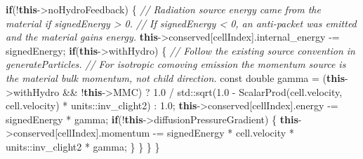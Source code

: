 \documentclass[
]{article}
\newenvironment{Shaded}{}{}
\newcommand{\AttributeTok}[1]{\textcolor[rgb]{0.49,0.56,0.16}{#1}}
\newcommand{\BuiltInTok}[1]{\textcolor[rgb]{0.00,0.50,0.00}{#1}}
\newcommand{\CommentTok}[1]{\textcolor[rgb]{0.38,0.63,0.69}{\textit{#1}}}
\newcommand{\ControlFlowTok}[1]{\textcolor[rgb]{0.00,0.44,0.13}{\textbf{#1}}}
\newcommand{\DataTypeTok}[1]{\textcolor[rgb]{0.56,0.13,0.00}{#1}}
\newcommand{\FloatTok}[1]{\textcolor[rgb]{0.25,0.63,0.44}{#1}}
\newcommand{\KeywordTok}[1]{\textcolor[rgb]{0.00,0.44,0.13}{\textbf{#1}}}
\newcommand{\NormalTok}[1]{#1}
\newcommand{\OperatorTok}[1]{\textcolor[rgb]{0.40,0.40,0.40}{#1}}
\begin{document}
\begin{Shaded}
\begin{Highlighting}[]
    \ControlFlowTok{if}\OperatorTok{(!}\KeywordTok{this}\OperatorTok{{-}\textgreater{}}\NormalTok{noHydroFeedback}\OperatorTok{)}
    \OperatorTok{\{}
        \CommentTok{// Radiation source energy came from the material if signedEnergy \textgreater{} 0.}
        \CommentTok{// If signedEnergy \textless{} 0, an anti{-}packet was emitted and the material gains energy.}
        \KeywordTok{this}\OperatorTok{{-}\textgreater{}}\NormalTok{conserved}\OperatorTok{[}\NormalTok{cellIndex}\OperatorTok{].}\NormalTok{internal\_energy }\OperatorTok{{-}=}\NormalTok{ signedEnergy}\OperatorTok{;}
        \ControlFlowTok{if}\OperatorTok{(}\KeywordTok{this}\OperatorTok{{-}\textgreater{}}\NormalTok{withHydro}\OperatorTok{)}
        \OperatorTok{\{}
            \CommentTok{// Follow the existing source convention in generateParticles.}
            \CommentTok{// For isotropic comoving emission the momentum source is the material bulk momentum, not child direction.}
            \AttributeTok{const} \DataTypeTok{double}\NormalTok{ gamma }\OperatorTok{=} \OperatorTok{(}\KeywordTok{this}\OperatorTok{{-}\textgreater{}}\NormalTok{withHydro }\OperatorTok{\&\&} \OperatorTok{!}\KeywordTok{this}\OperatorTok{{-}\textgreater{}}\NormalTok{MMC}\OperatorTok{)}
                \OperatorTok{?} \FloatTok{1.0} \OperatorTok{/} \BuiltInTok{std::}\NormalTok{sqrt}\OperatorTok{(}\FloatTok{1.0} \OperatorTok{{-}}\NormalTok{ ScalarProd}\OperatorTok{(}\NormalTok{cell}\OperatorTok{.}\NormalTok{velocity}\OperatorTok{,}\NormalTok{ cell}\OperatorTok{.}\NormalTok{velocity}\OperatorTok{)} \OperatorTok{*}\NormalTok{ units}\OperatorTok{::}\NormalTok{inv\_clight2}\OperatorTok{)}
                \OperatorTok{:} \FloatTok{1.0}\OperatorTok{;}
            \KeywordTok{this}\OperatorTok{{-}\textgreater{}}\NormalTok{conserved}\OperatorTok{[}\NormalTok{cellIndex}\OperatorTok{].}\NormalTok{energy }\OperatorTok{{-}=}\NormalTok{ signedEnergy }\OperatorTok{*}\NormalTok{ gamma}\OperatorTok{;}
            \ControlFlowTok{if}\OperatorTok{(!}\KeywordTok{this}\OperatorTok{{-}\textgreater{}}\NormalTok{diffusionPressureGradient}\OperatorTok{)}
            \OperatorTok{\{}
                \KeywordTok{this}\OperatorTok{{-}\textgreater{}}\NormalTok{conserved}\OperatorTok{[}\NormalTok{cellIndex}\OperatorTok{].}\NormalTok{momentum }\OperatorTok{{-}=}\NormalTok{ signedEnergy }\OperatorTok{*}\NormalTok{ cell}\OperatorTok{.}\NormalTok{velocity }\OperatorTok{*}\NormalTok{ units}\OperatorTok{::}\NormalTok{inv\_clight2 }\OperatorTok{*}\NormalTok{ gamma}\OperatorTok{;}
            \OperatorTok{\}}
        \OperatorTok{\}}
    \OperatorTok{\}}
\OperatorTok{\}}
\end{Highlighting}
\end{Shaded}
\end{document}
